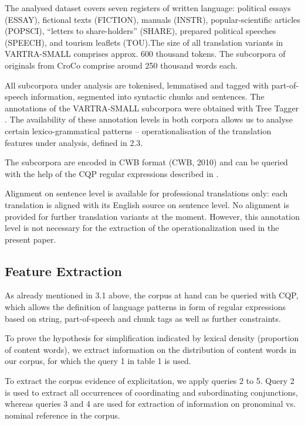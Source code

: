 \documentclass[output=paper]{LSP/langsci}
\begin{document}
The analysed dataset covers seven registers of written language: political essays (ESSAY), fictional texts (FICTION), manuals (INSTR), popular-scientific articles (POPSCI), “letters to share-holders” (SHARE), prepared political speeches (SPEECH), and tourism leaflets (TOU).The size of all translation variants in VARTRA-SMALL comprises approx. 600 thousand tokens.  The subcorpora of originals from CroCo comprise around 250 thousand words each.

All subcorpora under analysis are tokenised, lemmatised and tagged with part-of-speech information, segmented into syntactic chunks and sentences.  The annotations of the VARTRA-SMALL subcorpora were obtained with Tree Tagger \citep{Schmid1994}. The availability of these annotation levels in both corpora allows us to analyse certain lexico-grammatical patterns – operationalisation of the translation features under analysis, defined in 2.3.

The subcorpora are encoded in CWB format (CWB, 2010) and can be queried with the help of the CQP regular expressions described in \citep{Evert2005}.

Alignment on sentence level is available for professional translations only: each translation is aligned with its English source on sentence level.  No alignment is provided for further translation variants at the moment. However, this annotation level is not necessary for the extraction of the operationalization used in the present paper.

\subsection{Feature Extraction}
As already mentioned in 3.1 above, the corpus at hand can be queried with CQP, which allows the definition of language patterns in form of regular expressions based on string, part-of-speech and chunk tags as well as further constraints.

To prove the hypothesis for simplification indicated by lexical density (proportion of content words), we extract information on the distribution of content words in our corpus, for which the query 1 in table 1 is used.

To extract the corpus evidence of explicitation, we apply queries 2 to 5. Query 2 is used to extract all occurrences of coordinating and subordinating conjunctions, whereas queries 3 and 4 are used for extraction of information on pronominal vs. nominal reference in the corpus. 
\end{document}
